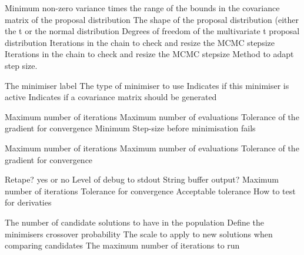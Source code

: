  {Minimum non-zero variance times the range of the bounds in the covariance matrix of the proposal distribution}
 {The shape of the proposal distribution (either the t or the normal distribution}
 {Degrees of freedom of the multivariate t proposal distribution}
 {Iterations in the chain to check and resize the MCMC stepsize}
 {Iterations in the chain to check and resize the MCMC stepsize}
 {Method to adapt step size.}
\par\par
{} {The minimiser label}
 {The type of minimiser to use}
 {Indicates if this minimiser is active}
 {Indicates if a covariance matrix should be generated}
\par\textbf{}\par
{} {Maximum number of iterations}
 {Maximum number of evaluations}
 {Tolerance of the gradient for convergence}
 {Minimum Step-size before minimisation fails}
\par\textbf{}\par
{} {Maximum number of iterations}
 {Maximum number of evaluations}
 {Tolerance of the gradient for convergence}
\par\textbf{}\par
{} {Retape? yes or no}
 {Level of debug to stdout}
 {String buffer output?}
 {Maximum number of iterations}
 {Tolerance for convergence}
 {Acceptable tolerance}
 {}
 {How to test for derivaties}
 {}
\par\textbf{}\par
{} {The number of candidate solutions to have in the population}
 {Define the minimisers crossover probability}
 {The scale to apply to new solutions when comparing candidates}
 {The maximum number of iterations to run}

